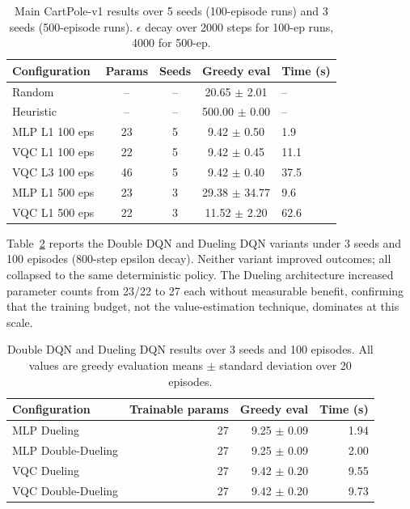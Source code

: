 \begin{table}[t]
  \centering
  \caption{Main CartPole-v1 results over 5 seeds (100-episode runs) and 3 seeds (500-episode runs). $\epsilon$ decay over 2000 steps for 100-ep runs, 4000 for 500-ep.}
  \label{tab:results}
  \footnotesize
  \begin{tabular}{lcccl}
    \hline
    Configuration & Params & Seeds & Greedy eval & Time (s) \\
    \hline
    Random & -- & -- & 20.65 $\pm$ 2.01 & -- \\
    Heuristic & -- & -- & 500.00 $\pm$ 0.00 & -- \\
    MLP L1 100 eps & 23 & 5 & 9.42 $\pm$ 0.50 & 1.9 \\
    VQC L1 100 eps & 22 & 5 & 9.42 $\pm$ 0.45 & 11.1 \\
    VQC L3 100 eps & 46 & 5 & 9.42 $\pm$ 0.40 & 37.5 \\
    MLP L1 500 eps & 23 & 3 & 29.38 $\pm$ 34.77 & 9.6 \\
    VQC L1 500 eps & 22 & 3 & 11.52 $\pm$ 2.20 & 62.6 \\
    \hline
  \end{tabular}
\end{table}

Table~\ref{tab:results-new} reports the Double DQN and Dueling DQN variants
under 3 seeds and 100 episodes (800-step epsilon decay). Neither variant
improved outcomes; all collapsed to the same deterministic policy. The Dueling
architecture increased parameter counts from 23/22 to 27 each without
measurable benefit, confirming that the training budget, not the
value-estimation technique, dominates at this scale.

\begin{table}[t]
  \centering
  \caption{Double DQN and Dueling DQN results over 3 seeds and 100 episodes. All values are greedy evaluation means $\pm$ standard deviation over 20 episodes.}
  \label{tab:results-new}
  \begin{tabular}{lrrr}
    \hline
    Configuration & Trainable params & Greedy eval & Time (s) \\
    \hline
    MLP Dueling & 27 & 9.25 $\pm$ 0.09 & 1.94 \\
    MLP Double-Dueling & 27 & 9.25 $\pm$ 0.09 & 2.00 \\
    VQC Dueling & 27 & 9.42 $\pm$ 0.20 & 9.55 \\
    VQC Double-Dueling & 27 & 9.42 $\pm$ 0.20 & 9.73 \\
    \hline
  \end{tabular}
\end{table}

